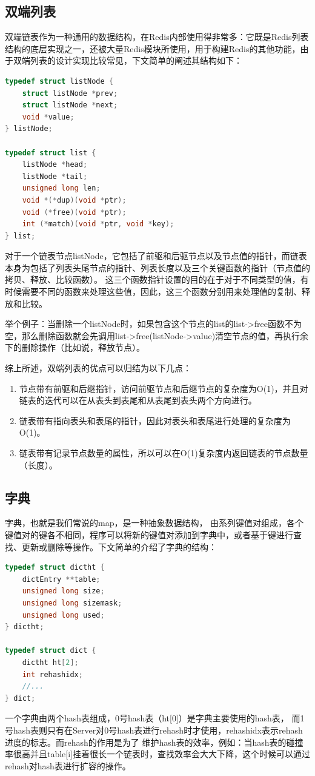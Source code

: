 \documentclass{zjutthesis}
\begin{document}
\subsection{双端列表}
双端链表作为一种通用的数据结构，在Redis内部使用得非常多：它既是Redis列表结构的底层实现之一，还被大量Redis模块所使用，用于构建Redis的其他功能，由于双端列表的设计实现比较常见，下文简单的阐述其结构如下：
\begin{lstlisting}[language=C]
typedef struct listNode {
    struct listNode *prev;
    struct listNode *next;
    void *value;
} listNode;

typedef struct list {
    listNode *head;
    listNode *tail;
    unsigned long len;
    void *(*dup)(void *ptr);
    void (*free)(void *ptr);
    int (*match)(void *ptr, void *key);
} list;
\end{lstlisting}
对于一个链表节点listNode，它包括了前驱和后驱节点以及节点值的指针，而链表本身为包括了列表头尾节点的指针、列表长度以及三个关键函数的指针（节点值的拷贝、释放、比较函数）。
这三个函数指针设置的目的在于对于不同类型的值，有时候需要不同的函数来处理这些值，因此，这三个函数分别用来处理值的复制、释放和比较。

举个例子：当删除一个listNode时，如果包含这个节点的list的list->free函数不为空，那么删除函数就会先调用list->free(listNode->value)清空节点的值，再执行余下的删除操作（比如说，释放节点）。

综上所述，双端列表的优点可以归结为以下几点：

\begin{enumerate}[label=（\arabic*）]
\item{节点带有前驱和后继指针，访问前驱节点和后继节点的复杂度为O(1)，并且对链表的迭代可以在从表头到表尾和从表尾到表头两个方向进行。}
\item{链表带有指向表头和表尾的指针，因此对表头和表尾进行处理的复杂度为O(1)。}
\item{链表带有记录节点数量的属性，所以可以在O(1)复杂度内返回链表的节点数量（长度）。}
\end{enumerate}

\subsection{字典}
字典，也就是我们常说的map，是一种抽象数据结构， 由系列键值对组成，各个键值对的键各不相同，程序可以将新的键值对添加到字典中，或者基于键进行查找、更新或删除等操作。下文简单的介绍了字典的结构：
\begin{lstlisting}[language=C]
typedef struct dictht {
    dictEntry **table;
    unsigned long size;
    unsigned long sizemask;
    unsigned long used;
} dictht;

typedef struct dict {
    dictht ht[2];
    int rehashidx;
    //...
} dict;
\end{lstlisting}
一个字典由两个hash表组成，0号hash表（ht[0]）是字典主要使用的hash表， 而1号hash表则只有在Server对0号hash表进行rehash时才使用，rehashidx表示rehash进度的标志。而rehash的作用是为了
维护hash表的效率，例如：当hash表的碰撞率很高并且table[i]挂着很长一个链表时，查找效率会大大下降，这个时候可以通过rehash对hash表进行扩容的操作。
\end{document}
